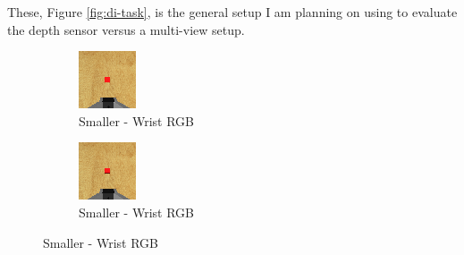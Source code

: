 These, Figure \ref{fig:di-task}, is the general setup I am planning on using to evaluate the depth sensor versus a multi-view setup. 

\begin{figure}[htpb] %
  \centering
  \begin{subfigure}{0.4\linewidth}
    \centering
    \includegraphics[width=0.7\linewidth]{assets/depth-interfacing/normal-size-wrist.png}
    \caption{Smaller - Wrist RGB}\label{subfig:normal-rgb}
  \end{subfigure}
  \begin{subfigure}{0.4\linewidth}
    \centering
    \includegraphics[width=0.7\linewidth]{assets/depth-interfacing/smaller-wrist.png}
    \caption{Smaller - Wrist RGB}\label{subfig:small-rgb}
  \end{subfigure}

\end{figure}
